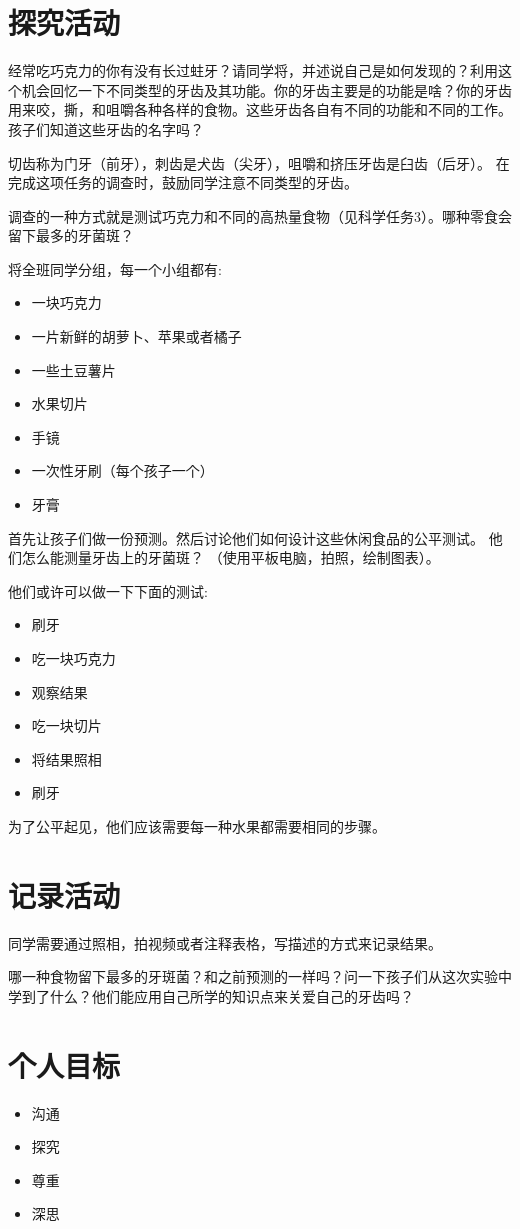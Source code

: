 \section{探究活动}
     经常吃巧克力的你有没有长过蛀牙？请同学将，并述说自己是如何发现的？利用这个机会回忆一下不同类型的牙齿及其功能。你的牙齿主要是的功能是啥？你的牙齿用来咬，撕，和咀嚼各种各样的食物。这些牙齿各自有不同的功能和不同的工作。孩子们知道这些牙齿的名字吗？\par
     切齿称为门牙（前牙），刺齿是犬齿（尖牙），咀嚼和挤压牙齿是臼齿（后牙）。 在完成这项任务的调查时，鼓励同学注意不同类型的牙齿。\par
     调查的一种方式就是测试巧克力和不同的高热量食物（见科学任务3）。哪种零食会留下最多的牙菌斑？\par
     将全班同学分组，每一个小组都有:\par
     \begin{itemize}
       \item 一块巧克力
       \item 一片新鲜的胡萝卜、苹果或者橘子
       \item 一些土豆薯片
       \item 水果切片
       \item 手镜
       \item 一次性牙刷（每个孩子一个）
       \item 牙膏
     \end{itemize}  
     首先让孩子们做一份预测。然后讨论他们如何设计这些休闲食品的公平测试。 他们怎么能测量牙齿上的牙菌斑？ （使用平板电脑，拍照，绘制图表）。\par
     他们或许可以做一下下面的测试:\par
     \begin{itemize}
       \item 刷牙
       \item 吃一块巧克力
       \item 观察结果
       \item 吃一块切片
       \item 将结果照相
       \item 刷牙
     \end{itemize}
       为了公平起见，他们应该需要每一种水果都需要相同的步骤。

\section{记录活动}
   同学需要通过照相，拍视频或者注释表格，写描述的方式来记录结果。\par
   哪一种食物留下最多的牙斑菌？和之前预测的一样吗？问一下孩子们从这次实验中学到了什么？他们能应用自己所学的知识点来关爱自己的牙齿吗？

\section{个人目标}
   \begin{itemize}
     \item 沟通
     \item 探究
     \item 尊重
     \item 深思
   \end{itemize}  
